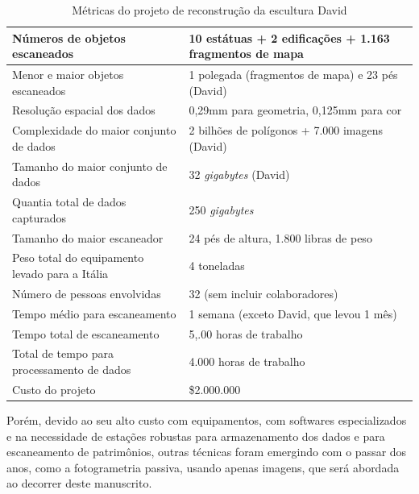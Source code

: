 \begin{table}
\caption{Métricas do projeto de reconstrução da escultura David}
\label{tab:metricasDavid}
\begin{tabular}{|l|p{4.7cm}|}
\hline
Números de objetos escaneados          & 10 estátuas + 2 edificações + 1.163 fragmentos de mapa  \\ \hline
Menor e maior objetos escaneados       & 1 polegada (fragmentos de mapa) e 23 pés (David)         \\ \hline
Resolução espacial dos dados                & 0,29mm para geometria, 0,125mm para cor              \\ \hline
Complexidade do maior conjunto de dados             & 2 bilhões de polígonos + 7.000 imagens (David)\\ \hline
Tamanho do maior conjunto de dados                    & 32 \emph{gigabytes} (David)                  \\ \hline
Quantia total de dados capturados              & 250 \emph{gigabytes}                                 \\ \hline
Tamanho do maior escaneador                    & 24 pés de altura, 1.800 libras de peso                  \\ \hline
Peso total do equipamento levado para a Itália & 4 toneladas                                              \\ \hline
Número de pessoas envolvidas                  & 32 (sem incluir colaboradores) \\ \hline
Tempo médio para escaneamento              & 1 semana (exceto David, que levou 1 mês)       \\ \hline
Tempo total de escaneamento                 & 5,.00 horas de trabalho                                   \\ \hline
Total de tempo para processamento de dados          & 4.000 horas de trabalho                            \\ \hline
Custo do projeto                          & \$2.000.000                                         \\ \hline
\end{tabular}
\end{table}


Porém, devido ao seu alto custo com equipamentos, com softwares especializados e na
necessidade de estações robustas para armazenamento dos dados e para
escaneamento de patrimônios, outras técnicas foram emergindo com o passar dos
anos, como a fotogrametria passiva, usando apenas imagens, que será abordada ao decorrer deste manuscrito.

% 
